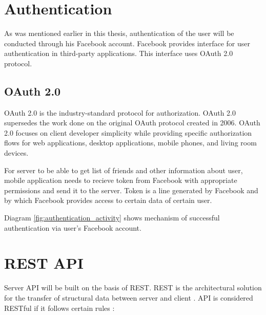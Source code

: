 \section{Authentication}
As was mentioned earlier in this thesis, authentication of the user will be conducted through his Facebook account.
Facebook provides interface for user authentication in third-party applications. This interface uses OAuth 2.0 protocol.

\subsection{OAuth 2.0}
OAuth 2.0 is the industry-standard protocol for authorization. OAuth 2.0 supersedes the work done on the original OAuth
protocol created in 2006. OAuth 2.0 focuses on client developer simplicity while providing specific authorization flows
for web applications, desktop applications, mobile phones, and living room devices. \cite{oauth}

For server to be able to get list of friends and other information about user, mobile application needs to recieve
token from Facebook with appropriate permissions and send it to the server. Token is a line generated by Facebook and
by which Facebook provides access to certain data of certain user.

Diagram \ref{fig:authentication_activity} shows mechanism of successful authentication via user's Facebook account.


\newcommand{\ritem}[1]{
    \item \textbf{#1} \par
}
\section{REST API}

Server API will be built on the basis of \ac{REST}. \ac{REST} is the architectural solution for the transfer of
structural data between server and client \cite{rest}.
API is considered RESTful if it follows certain rules \cite{whatisrest}:

